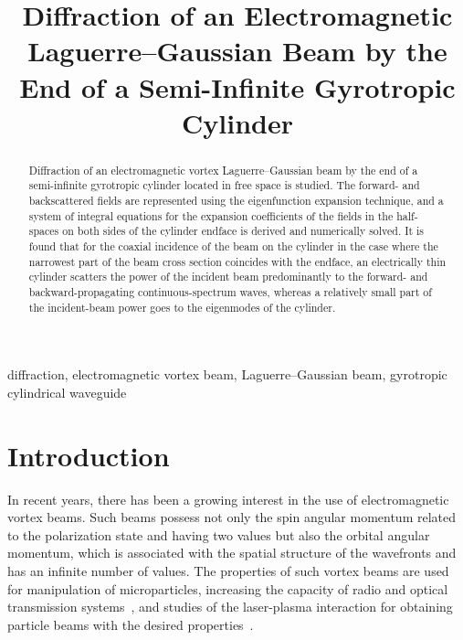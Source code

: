 \documentclass[conference,a4paper]{IEEEtran}
\begin{document}
\title{Diffraction of an Electromagnetic Laguerre--Gaussian Beam by the End of a Semi-Infinite Gyrotropic Cylinder}

\author{
\and
{}

}

\def\f{\phi}
\def\e{\varepsilon}
\newcommand{\cir}[1]{\mathop{#1}\limits^\circ}
\def\r{\rho}
\def\d{\textrm{d}}
\def\o{\omega}
\def\a{\alpha}
\def\b{\beta}
\def\PLG{P_{\rm LG}}

\maketitle

\begin{abstract}
Diffraction of an electromagnetic vortex Laguerre--Gaussian beam by the end of a semi-infinite gyrotropic cylinder located in free space is studied. The forward- and backscattered fields are represented using the eigenfunction expansion technique, and a system of integral equations for the expansion coefficients of the fields in the half-spaces on both sides of the cylinder endface is derived and numerically solved. It is found that for the coaxial incidence of the beam on the cylinder in the case where the narrowest part of the beam cross section coincides with the endface, an electrically thin cylinder scatters the power of the incident beam predominantly to the forward- and backward-propagating continuous-spectrum waves, whereas a relatively small part of the incident-beam power goes to the eigenmodes of the cylinder.
\end{abstract}

\begin{IEEEkeywords}
diffraction, electromagnetic vortex beam, Laguerre--Gaussian beam, gyrotropic cylindrical waveguide
\end{IEEEkeywords}

\section{Introduction}
In recent years, there has been a growing interest in the use of electromagnetic vortex beams. Such beams possess not only the spin angular momentum related to the polarization state and having two values but also the orbital angular momentum, which is associated with the spatial structure of the wavefronts and has an infinite number of values. The properties of such vortex beams are used for manipulation of microparticles, increasing the capacity of radio and optical transmission systems~\cite{b8}, and studies of the laser-plasma interaction for obtaining particle beams with the desired properties~\cite{b9,b10,b11}.
\end{document}

